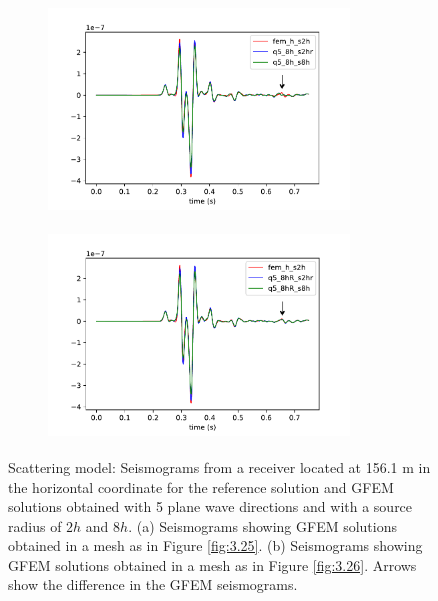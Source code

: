  \begin{figure}[h!]
 		\centering
		\begin{subfigure}{8cm}
				\includegraphics[width=8cm, height=5.5cm]{Thesis_Edith/figures/scattering/scat_waves/gfem_scat_tr15_v2.pdf} 
			     \caption{}
		\end{subfigure}
        \hspace{0.25cm}	
		\begin{subfigure}{8cm}
				\includegraphics[width=8cm, height=5.5cm]{Thesis_Edith/figures/scattering/scat_waves/gfemr_scat_tr15_v2.pdf}
			   \caption{}
		\end{subfigure}
 
	\caption{Scattering model: Seismograms from a receiver located at 156.1 m in the horizontal coordinate for the reference solution and  GFEM solutions obtained   with 5 plane wave directions and with  a source radius of $2h$ and $8h$. (a) Seismograms showing GFEM solutions obtained in a mesh as in Figure \ref{fig:3.25}. (b) Seismograms showing GFEM solutions obtained in a mesh as in Figure \ref{fig:3.26}. Arrows show the difference in the GFEM seismograms.}
	\label{fig:3.29}
\end{figure}

